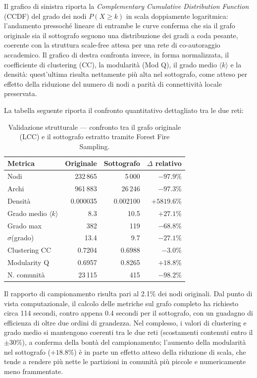 \documentclass[11pt, a4paper]{article}
\begin{document}
Il grafico di sinistra riporta la \textit{Complementary Cumulative Distribution Function} (CCDF) del grado dei nodi $P(X \ge k)$ in scala doppiamente logaritmica: l'andamento pressoché lineare di entrambe le curve conferma che sia il grafo originale sia il sottografo seguono una distribuzione dei gradi a coda pesante, coerente con la struttura scale-free attesa per una rete di co-autoraggio accademico. Il grafico di destra confronta invece, in forma normalizzata, il coefficiente di clustering (CC), la modularità (Mod Q), il grado medio $\langle k \rangle$ e la densità: quest'ultima risulta nettamente più alta nel sottografo, come atteso per effetto della riduzione del numero di nodi a parità di connettività locale preservata.

La tabella seguente riporta il confronto quantitativo dettagliato tra le due reti:

\begin{table}[h]
    \centering
    \small
    \begin{tabular}{lrrr}
        \toprule
        \textbf{Metrica} & \textbf{Originale} & \textbf{Sottografo} & \textbf{$\Delta$ relativo} \\
        \midrule
        Nodi                  & 232\,865 & 5\,000  & $-97.9\%$ \\
        Archi                 & 961\,883 & 26\,246 & $-97.3\%$ \\
        Densità               & 0.000035 & 0.002100 & $+5819.6\%$ \\
        Grado medio $\langle k \rangle$ & 8.3    & 10.5    & $+27.1\%$ \\
        Grado max             & 382      & 119     & $-68.8\%$ \\
        $\sigma$(grado)       & 13.4     & 9.7     & $-27.1\%$ \\
        Clustering CC         & 0.7204   & 0.6988  & $-3.0\%$ \\
        Modularity Q          & 0.6957   & 0.8265  & $+18.8\%$ \\
        N. comunità           & 23\,115  & 415     & $-98.2\%$ \\
        \bottomrule
    \end{tabular}
    \caption{Validazione strutturale — confronto tra il grafo originale (LCC) e il sottografo estratto tramite Forest Fire Sampling.}
    \label{tab:validazione-strutturale}
\end{table}

Il rapporto di campionamento risulta pari al 2.1\% dei nodi originali. Dal punto di vista computazionale, il calcolo delle metriche sul grafo completo ha richiesto circa 114 secondi, contro appena 0.4 secondi per il sottografo, con un guadagno di efficienza di oltre due ordini di grandezza. Nel complesso, i valori di clustering e grado medio si mantengono coerenti tra le due reti (scostamenti contenuti entro il $\pm 30\%$), a conferma della bontà del campionamento; l'aumento della modularità nel sottografo ($+18.8\%$) è in parte un effetto atteso della riduzione di scala, che tende a rendere più nette le partizioni in comunità più piccole e numericamente meno frammentate.
\end{document}
